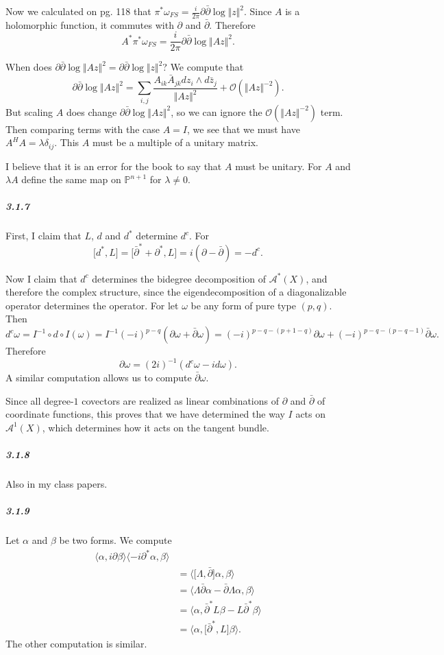 \documentclass[10pt,letter]{article}
\begin{document}
Now we calculated on pg. 118 that $\pi^{\ast} \omega_{FS}= \frac{i}{2\pi} \partial \bar{\partial} \log \Vert z \Vert^2$. Since $A$ is a holomorphic function, it commutes with $\partial$ and $\bar{\partial}$. Therefore \[ A^{\ast}  \pi^{\ast} \omega_{FS} =  \frac{i}{2\pi} \partial \bar{\partial} \log \Vert Az \Vert^2.\]

When does $\partial \bar{\partial} \log \Vert Az \Vert^2 = \partial \bar{\partial} \log \Vert z \Vert^2$? We compute that
\[ \partial \bar{\partial}\log \Vert Az \Vert^2 = \sum_{i,j} \frac{A_{ik}\bar{A}_{jk} dz_i \wedge d\bar{z}_j}{\Vert Az \Vert^2} + \mathcal{O}(\Vert Az \Vert^{-2}).\]
But scaling $A$ does change $\partial \bar{\partial} \log \Vert Az \Vert^2$, so we can ignore the $\mathcal{O}(\Vert Az \Vert^{-2})$ term. Then comparing terms with the case $A = I$, we see that we must have $A^HA = \lambda \delta_{ij}$. This $A$ must be a multiple of a unitary matrix. 

I believe that it is an error for the book to say that $A$ must be unitary. For $A$ and $\lambda A$ define the same map on $\mathbb{P}^{n+1}$ for $\lambda \neq 0$. 

\subparagraph{3.1.7} First, I claim that $L$, $d$ and $d^{\ast}$ determine $d^c$. For 
\[ \lbrack d^{\ast},L \rbrack =  \lbrack \bar{\partial}^{\ast} + \partial^{\ast},L \rbrack = i(\partial - \bar{\partial}) = -d^c.\]

Now I claim that $d^c$ determines the bidegree decomposition of $\mathcal{A}^{\ast}(X)$, and therefore the complex structure, since the eigendecomposition of a diagonalizable operator determines the operator. For let $\omega$ be any form of pure type $(p,q)$. Then \[ d^c \omega = I^{-1} \circ d \circ I(\omega) = I^{-1} (-i)^{p-q} (\partial\omega + \bar{\partial}{\omega}) = (-i)^{p-q-(p+1-q)}\partial\omega  + (-i)^{p-q-(p-q-1)}\bar{\partial}\omega.\]
Therefore \[ \partial \omega = (2i)^{-1}(d^c\omega - i d \omega).\] A similar computation allows us to compute $\bar\partial \omega$. 

Since all degree-$1$ covectors are realized as linear combinations of $\partial$ and $\bar \partial$ of coordinate functions, this proves that we have determined the way $I$ acts on $\mathcal{A}^1(X)$, which determines how it acts on the tangent bundle. 

\subparagraph{3.1.8} Also in my class papers.
\subparagraph{3.1.9} Let $\alpha$ and $\beta$ be two forms. We compute
\begin{align*}
\langle \alpha, i\partial \beta \rangle
\langle -i \partial^{\ast} \alpha, \beta \rangle \\ &= \langle\lbrack \Lambda, \bar{\partial} \rbrack \alpha, \beta \rangle \\ 
&= \langle \Lambda \bar{\partial} \alpha - \bar{\partial} \Lambda  \alpha, \beta \rangle \\
&= \langle  \alpha, \bar {\partial}^{\ast} L  \beta -   L \bar {\partial}^{\ast}   \beta   \rangle \\
&= \langle \alpha, \lbrack  \bar{\partial}^{\ast},L \rbrack  \beta \rangle.
\end{align*} 
The other computation is similar. 
\end{document}
